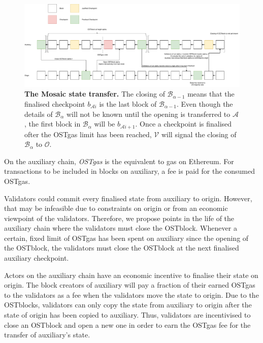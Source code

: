 \documentclass[12pt,a4paper]{article}
\newcommand{\A}{\mathcal{A}}
\newcommand{\OC}{\mathcal{O}}
\newcommand{\V}{\mathcal{V}}
\newcommand{\B}{\mathcal{B}}
\begin{document}
\begin{figure}[htb]
    \centering
	\includegraphics[width=\textwidth]{mosaic}
	\caption{
		\textbf{The Mosaic state transfer.} 
		The closing of $\B_{\alpha-1}$ means that the finalised checkpoint $b_{\A{}i}$ is the last block of $\B_{\alpha-1}$.
		Even though the details of $\B_\alpha$ will not be known until the opening is transferred to $\A$,
		the first block in $\B_\alpha$ will be $b_{\A{}i+1}$.
		Once a checkpoint is finalised ofter the OSTgas limit has been reached,
		$\V$ will signal the closing of $\B_\alpha$ to $\OC$.
	}
	\label{fig:mosaic}
\end{figure}

On the auxiliary chain, \emph{OSTgas} is the equivalent to gas on Ethereum.
For transactions to be included in blocks on auxiliary, a fee is paid for the consumed OSTgas.

Validators could commit every finalised state from auxiliary to origin.
However, that may be infeasible due to constraints on origin or from an economic viewpoint of the validators.
Therefore, we propose points in the life of the auxiliary chain where the validators must close the OSTblock.
Whenever a certain, fixed limit of OSTgas has been spent on auxiliary since the opening of the OSTblock,
the validators must close the OSTblock at the next finalised auxiliary checkpoint. 

Actors on the auxiliary chain have an economic incentive to finalise their state on origin.
The block creators of auxiliary will pay a fraction of their earned OSTgas to the validators as a fee when the validators move the state to origin.
Due to the OSTblocks, validators can only copy the state from auxiliary to origin after the state of origin has been copied to auxiliary.
Thus, validators are incentivised to close an OSTblock and open a new one in order to earn the OSTgas fee for the transfer of auxiliary's state.
\end{document}
